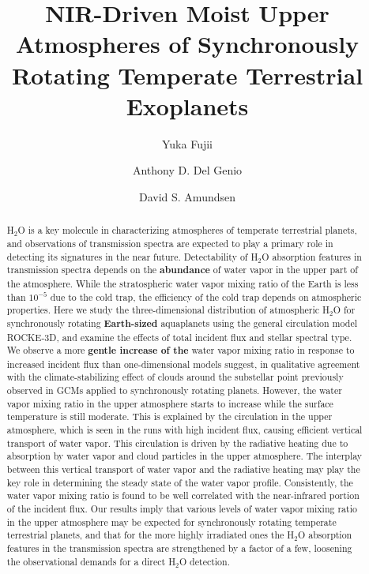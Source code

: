 \documentclass[11pt,numberedappendix,twocolappendix,]{emulateapj}
\def\revise#1{{\bf #1}}
\begin{document}

\title{NIR-Driven Moist Upper Atmospheres of Synchronously Rotating Temperate Terrestrial Exoplanets}

\author{Yuka Fujii}

\author{Anthony D. Del Genio}

\author{David S. Amundsen}


\begin{abstract}
%
H$_2$O is a key molecule in characterizing atmospheres of temperate terrestrial planets, and observations of transmission spectra are expected to play a primary role in detecting its signatures in the near future. 
Detectability of H$_2$O absorption features in transmission spectra depends on the \revise{abundance} of water vapor in the upper part of the atmosphere. 
While the stratospheric water vapor mixing ratio of the Earth is less than $10^{-5}$ due to the cold trap, the efficiency of the cold trap depends on atmospheric properties. 
Here we study the three-dimensional distribution of atmospheric H$_2$O for synchronously rotating \revise{Earth-sized} aquaplanets using the general circulation model ROCKE-3D, and examine the effects of total incident flux and stellar spectral type.  
We observe a more \revise{gentle increase of the} water vapor mixing ratio in response to increased incident flux than one-dimensional models suggest, in qualitative agreement with the climate-stabilizing effect of clouds around the substellar point previously observed in GCMs applied to synchronously rotating planets. 
However, the water vapor mixing ratio in the upper atmosphere starts to increase while the surface temperature is still moderate. 
This is explained by the circulation in the upper atmosphere, which is seen in the runs with high incident flux, causing efficient vertical transport of water vapor. 
This circulation is driven by the radiative heating due to absorption by water vapor and cloud particles in the upper atmosphere. 
The interplay between this vertical transport of water vapor and the radiative heating may play the key role in determining the steady state of the water vapor profile. 
Consistently, the water vapor mixing ratio is found to be well correlated with the near-infrared portion of the incident flux. 
Our results imply that various levels of water vapor mixing ratio in the upper atmosphere may be expected for synchronously rotating temperate terrestrial planets, and that for the more highly irradiated ones the H$_2$O absorption features in the transmission spectra are strengthened by a factor of a few, loosening the observational demands for a direct H$_2$O detection. 
%
\end{abstract}
\end{document}
